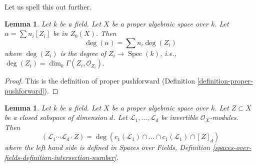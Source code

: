 \documentclass{stacks-project}
\theoremstyle{plain}
\newtheorem{lemma}[subsection]{Lemma}
\theoremstyle{definition}
\theoremstyle{remark}
\numberwithin{equation}{subsection}
\def\Spec{\mathop{\mathrm{Spec}}}
\begin{document}
\noindent
Let us spell this out further.

\begin{lemma}
\label{lemma-spell-out-degree-zero-cycle}
Let $k$ be a field. Let $X$ be a proper algebraic space over $k$.
Let $\alpha = \sum n_i[Z_i]$ be in $Z_0(X)$. Then
$$
\deg(\alpha) = \sum n_i\deg(Z_i)
$$
where $\deg(Z_i)$ is the degree of $Z_i \to \Spec(k)$, i.e.,
$\deg(Z_i) = \dim_k \Gamma(Z_i, \mathcal{O}_{Z_i})$.
\end{lemma}

\begin{proof}
This is the definition of proper pushforward
(Definition \ref{definition-proper-pushforward}).
\end{proof}

\begin{lemma}
\label{lemma-degrees-and-numerical-intersections}
Let $k$ be a field. Let $X$ be a proper algebraic space over $k$.
Let $Z \subset X$ be a closed subspace of dimension $d$.
Let $\mathcal{L}_1, \ldots, \mathcal{L}_d$ be invertible
$\mathcal{O}_X$-modules. Then
$$
(\mathcal{L}_1 \cdots \mathcal{L}_d \cdot Z) =
\deg(
c_1(\mathcal{L}_1) \cap \ldots \cap c_1(\mathcal{L}_1) \cap [Z]_d)
$$
where the left hand side is defined in
Spaces over Fields, Definition
\ref{spaces-over-fields-definition-intersection-number}.
\end{lemma}
\end{document}
